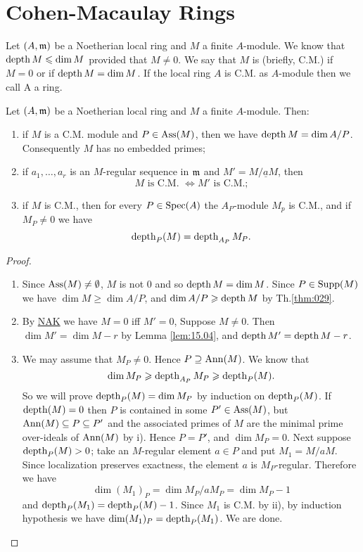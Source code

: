 \documentclass[../main]{subfiles}
\begin{document}
\section{Cohen-Macaulay Rings}\label{sec:16}

\newparagraph Let $(A,\mathfrak{m})$ be a Noetherian local ring and $M$ a finite $A$-module. We know that $\operatorname{depth} M \leqslant \operatorname{dim} M$ provided that $M \neq 0$. We say that $M$ is  (briefly, C.M.) if $M=0$ or if $\operatorname{depth} M=\operatorname{dim} M$. If the local ring $A$ is C.M. as $A$-module then we call A a  ring.

\begin{theorem}\label{thm:030}
Let $(A,\mathfrak{m})$ be a Noetherian local ring and $M$ a finite $A$-module. Then:
\begin{enumerate}[label=\roman*)]
    \item if $M$ is a C.M. module and $P \in \operatorname{Ass}(M)$, then we have $\operatorname{depth} M=\operatorname{dim} A/P$. Consequently $M$ has no embedded primes;
    \item if $a_1, \ldots, a_r$ is an $M$-regular sequence in $\mathfrak{m}$ and $M'=M / \underline{a} M$, then \[M\text{ is C.M. }\iff M'\text{ is C.M.;}\]
    \item if $M$ is C.M., then for every $P \in \operatorname{Spec}(A)$ the $A_P$-module $M_p$ is C.M., and if $M_P \neq 0$ we have \[\operatorname{depth}_P(M)=\operatorname{depth}_{A_P} M_P.\]
\end{enumerate}
\end{theorem}

\begin{proof}
\begin{enumerate}[label=\roman*)]
    \item Since $\operatorname{Ass}(M) \neq \emptyset$, $M$ is not $0$ and so $\operatorname{depth} M=\operatorname{dim} M$. Since $P \in \operatorname{Supp}(M)$ we have $\dim M \geqslant \dim A / P$, and $\operatorname{dim} A / P \geqslant \operatorname{depth} M$ by Th.\ref{thm:029}.
    \item By \hyperref[NAK]{NAK} we have $M=0$ iff $M'=0$, Suppose $M \neq 0$. Then \newline $\dim M'=\dim M-r$ by Lemma \ref{lem:15.04}, and $\operatorname{depth} M'=\operatorname{depth} M-r$.
    \item We may assume that $M_P \neq 0$. Hence $P \supseteq \operatorname{Ann}(M)$. We know that \[\operatorname{dim} M_P \geqslant \operatorname{depth}_{A_P}M_P \geqslant \operatorname{depth}_P(M).\] So we will prove $\operatorname{depth}_P(M)=\operatorname{dim} M_P$ by induction on $\operatorname{depth}_P(M)$. If $\operatorname{depth}(M)=0$ then $P$ is contained in some $P' \in \operatorname{Ass}(M)$, but \newline $\operatorname{Ann}(M) \subseteq P\subseteq P'$ and the associated primes of $M$ are the minimal prime over-ideals of $\operatorname{Ann}(M)$ by i). Hence $P=P'$, and $\dim M_P=0$. Next suppose $\operatorname{depth}_P(M)>0$; take an $M$-regular element $a \in P$ and put \newline $M_1=M / a M$. Since localization preserves exactness, the element $a$ is $M_P$-regular. Therefore we have \[\dim(M_1)_P=\dim M_P / aM_P=\dim M_P-1\] and $\operatorname{depth}_P(M_1)=\operatorname{depth}_P(M)-1$. Since $M_1$ is C.M. by ii), by induction hypothesis we have $\operatorname{dim}(M_1)_P=\operatorname{depth}_P(M_1)$. We are done.
\end{enumerate}
\end{proof}
\end{document}
